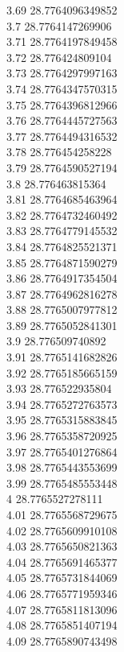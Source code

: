 {3.69	28.7764096349852\\
3.7	28.7764147269906\\
3.71	28.7764197849458\\
3.72	28.776424809104\\
3.73	28.7764297997163\\
3.74	28.7764347570315\\
3.75	28.7764396812966\\
3.76	28.7764445727563\\
3.77	28.7764494316532\\
3.78	28.776454258228\\
3.79	28.7764590527194\\
3.8	28.776463815364\\
3.81	28.7764685463964\\
3.82	28.7764732460492\\
3.83	28.7764779145532\\
3.84	28.7764825521371\\
3.85	28.7764871590279\\
3.86	28.7764917354504\\
3.87	28.7764962816278\\
3.88	28.7765007977812\\
3.89	28.7765052841301\\
3.9	28.776509740892\\
3.91	28.7765141682826\\
3.92	28.7765185665159\\
3.93	28.776522935804\\
3.94	28.7765272763573\\
3.95	28.7765315883845\\
3.96	28.7765358720925\\
3.97	28.7765401276864\\
3.98	28.7765443553699\\
3.99	28.7765485553448\\
4	28.7765527278111\\
4.01	28.7765568729675\\
4.02	28.7765609910108\\
4.03	28.7765650821363\\
4.04	28.7765691465377\\
4.05	28.7765731844069\\
4.06	28.7765771959346\\
4.07	28.7765811813096\\
4.08	28.7765851407194\\
4.09	28.7765890743498\\
}
